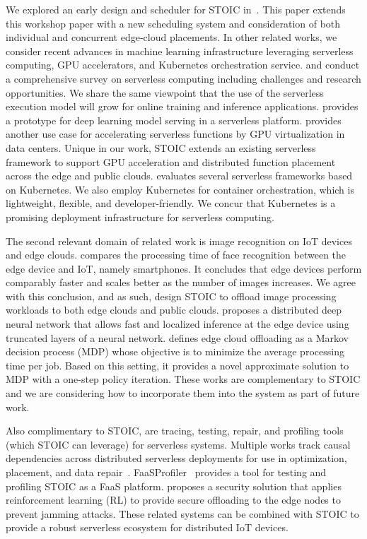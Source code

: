 We explored an early design and scheduler for STOIC in~\cite{ref:stoic}.  This paper extends this workshop paper with a new scheduling system and consideration of both individual and concurrent edge-cloud placements. In other related works, we consider recent advances in machine learning infrastructure leveraging serverless computing, GPU accelerators, and Kubernetes orchestration service. \cite{ref:serverlessstep} and \cite{ref:berkeleyserverless} conduct a comprehensive survey on serverless computing including challenges and research opportunities. We share the same viewpoint that the use of the serverless execution model will grow for online training and inference applications. \cite{ref:deepserving} provides a prototype for deep learning model serving in a serverless platform. \cite{ref:accelerated} provides another use case for accelerating serverless functions by GPU virtualization in data centers. Unique in our work, STOIC extends an existing serverless framework to support GPU acceleration and distributed function placement across the edge and public clouds. \cite{ref:evaluation} evaluates several serverless frameworks based on Kubernetes. We also employ Kubernetes for container orchestration, which is lightweight, flexible, and developer-friendly.  We concur that Kubernetes is a promising deployment infrastructure for serverless computing.  

The second relevant domain of related work is image recognition on IoT devices and edge clouds. \cite{ref:face} compares the processing time of face recognition between the edge device and IoT, namely smartphones. It concludes that edge devices perform comparably faster and scales better as the number of images increases. We agree with this conclusion, and as such, design STOIC to offload image processing workloads to both edge clouds and public clouds. \cite{ref:DDNN} proposes a distributed deep neural network that allows fast and localized inference at the edge device using truncated layers of a neural network. \cite{ref:cooperative} defines edge cloud offloading as a Markov decision process (MDP) whose objective is to minimize the average processing time per job. Based on this setting, it provides a novel approximate solution to MDP with a one-step policy iteration. These works are complementary to STOIC and we are considering how to incorporate them into the system as part of future work.

Also complimentary to STOIC, are tracing, testing, repair, and profiling tools (which STOIC can leverage) for serverless systems. Multiple works track causal dependencies across distributed serverless deployments for use in optimization, placement, and data repair~\cite{ref:repairdata,deptracing19,gammaray17,aws-xray}. FaaSProfiler~\cite{ref:profile} provides a tool for testing and profiling STOIC as a FaaS platform. \cite{ref:security} proposes a security solution that applies reinforcement learning (RL) to provide secure offloading to the edge nodes to prevent jamming attacks. These related systems can be combined with STOIC to provide a robust serverless ecosystem for distributed IoT devices.
